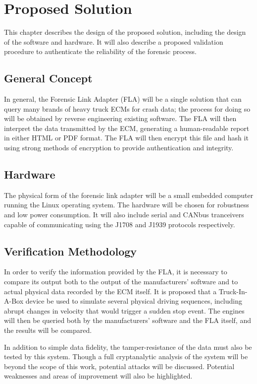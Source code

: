 \documentclass{report}
\begin{document}
\chapter{Proposed Solution}

This chapter describes the design of the proposed solution, including the design of the software and hardware. It will also describe a proposed validation procedure to authenticate
the reliability of the forensic process.

\section{General Concept}

In general, the Forensic Link Adapter (FLA) will be a single solution that can query many brands of heavy truck ECMs for crash data; the process for doing so will be obtained
by reverse engineering existing software. The FLA will then interpret the data transmitted by the ECM, generating a human-readable report in either HTML or PDF format. The
FLA will then encrypt this file and hash it using strong methods of encryption to provide authentication and integrity.

\section{Hardware}

The physical form of the forensic link adapter will be a small embedded computer running the Linux operating system. The hardware will be chosen for robustness and low power
consumption. It will also include serial and CANbus tranceivers capable of communicating using the J1708 and J1939 protocols respectively.

\section{Verification Methodology}

In order to verify the information provided by the FLA, it is necessary to compare its output both to the output of the manufacturers' software and to actual physical data
recorded by the ECM itself. It is proposed that a Truck-In-A-Box device be used to simulate several physical driving sequences, including abrupt changes in velocity that would
trigger a sudden stop event. The engines will then be queried both by the manufacturers' software and the FLA itself, and the results will be compared.

In addition to simple data fidelity, the tamper-resistance of the data must also be tested by this system. Though a full cryptanalytic analysis of the system will be beyond the
scope of this work, potential attacks will be discussed. Potential weaknesses and areas of improvement will also
be highlighted.
\end{document}
